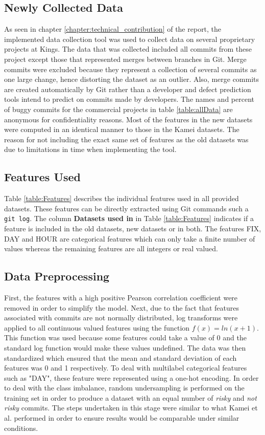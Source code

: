 \documentclass[../main.tex]{subfiles}
\begin{document}
\subsection{Newly Collected Data}

As seen in chapter \ref{chapter:technical_contribution} of the report, the implemented data collection tool was used to collect data on several proprietary projects at Kings. The data that was collected included all commits from these project except those that represented merges between branches in Git. Merge commits were excluded because they represent a collection of several commits as one large change, hence distorting the dataset as an outlier. Also, merge commits are created automatically by Git rather than a developer and defect prediction tools intend to predict on commits made by developers. The names and percent of buggy commits for the commercial projects in table \ref{table:allData} are anonymous for confidentiality reasons. Most of the features in the new datasets were computed in an identical manner to those in the Kamei datasets. The reason for not including the exact same set of features as the old datasets was due to limitations in time when implementing the tool. 

\subsection{Features Used}

Table \ref{table:Features} describes the individual features used in all provided datasets. These features can be directly extracted using Git commands such a \texttt{git log}. The column \textbf{Datasets used in} in Table \ref{table:Features} indicates if a feature is included in the old datasets, new datasets or in both. The features FIX, DAY and HOUR are categorical features which can only take a finite number of values whereas the remaining features are all integers or real valued. 

\subsection{Data Preprocessing}

First, the features with a high positive Pearson correlation coefficient were removed in order to simplify the model. Next, due to the fact that features associated with commits are not normally distributed, log transforms were applied to all continuous valued features using the function $f(x) = ln(x+1)$. This function was used because some features could take a value of 0 and the standard log function would make these values undefined. The data was then standardized which ensured that the mean and standard deviation of each features was 0 and 1 respectively. To deal with multilabel categorical features such as "DAY", these feature were represented using a one-hot encoding. In order to deal with the class imbalance, random undersampling is performed on the training set in order to produce a dataset with an equal number of \textit{risky} and \textit{not risky} commits. The steps undertaken in this stage were similar to what Kamei et al. performed \cite{kamei2013large} in order to ensure results would be comparable under similar conditions. 
\end{document}
